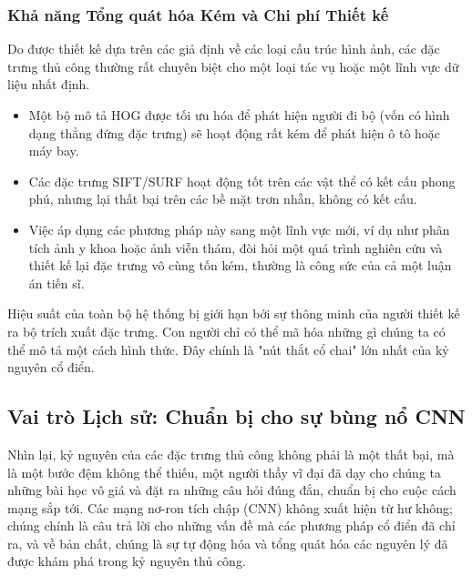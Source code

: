 \subsubsection{Khả năng Tổng quát hóa Kém và Chi phí Thiết kế}
\label{subsubsec:poor_generalization}
Do được thiết kế dựa trên các giả định về các loại cấu trúc hình ảnh, các đặc trưng thủ công thường rất chuyên biệt cho một loại tác vụ hoặc một lĩnh vực dữ liệu nhất định.
\begin{itemize}
	\item Một bộ mô tả HOG được tối ưu hóa để phát hiện người đi bộ (vốn có hình dạng thẳng đứng đặc trưng) sẽ hoạt động rất kém để phát hiện ô tô hoặc máy bay.
	\item Các đặc trưng SIFT/SURF hoạt động tốt trên các vật thể có kết cấu phong phú, nhưng lại thất bại trên các bề mặt trơn nhẵn, không có kết cấu.
	\item Việc áp dụng các phương pháp này sang một lĩnh vực mới, ví dụ như phân tích ảnh y khoa hoặc ảnh viễn thám, đòi hỏi một quá trình nghiên cứu và thiết kế lại đặc trưng vô cùng tốn kém, thường là công sức của cả một luận án tiến sĩ.
\end{itemize}
Hiệu suất của toàn bộ hệ thống bị giới hạn bởi sự thông minh của người thiết kế ra bộ trích xuất đặc trưng. Con người chỉ có thể mã hóa những gì chúng ta có thể mô tả một cách hình thức. Đây chính là "nút thắt cổ chai" lớn nhất của kỷ nguyên cổ điển.

\subsection{Vai trò Lịch sử: Chuẩn bị cho sự bùng nổ CNN}
\label{subsec:historical_role_cnn_bridge}

Nhìn lại, kỷ nguyên của các đặc trưng thủ công không phải là một thất bại, mà là một bước đệm không thể thiếu, một người thầy vĩ đại đã dạy cho chúng ta những bài học vô giá và đặt ra những câu hỏi đúng đắn, chuẩn bị cho cuộc cách mạng sắp tới. Các mạng nơ-ron tích chập (CNN) không xuất hiện từ hư không; chúng chính là câu trả lời cho những vấn đề mà các phương pháp cổ điển đã chỉ ra, và về bản chất, chúng là sự tự động hóa và tổng quát hóa các nguyên lý đã được khám phá trong kỷ nguyên thủ công.

